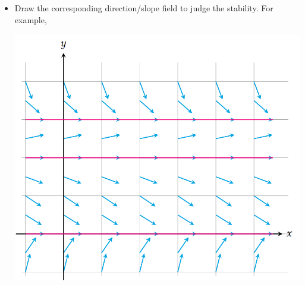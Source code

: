 \documentclass[10pt, landscape]{article}
\begin{document}
\begin{multicols}{4}
\begin{enumerate}
\begin{itemize}
        \item Draw the corresponding direction/slope field to judge the stability. For example,\\
        \centerline{\includegraphics[width=0.5\linewidth]{image/direction-field.png}}
    \end{itemize}
\end{enumerate}

\end{multicols}
\end{document}
